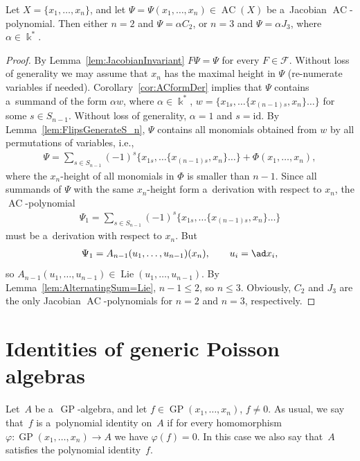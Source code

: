 \begin{theorem}
Let $X=\{x_1,\dots, x_n\}$, and let $\Psi =\Psi(x_1,\dots, x_n)\in \operatorname{AC}(X)$ be a~Jacobian $\operatorname{AC}$-polynomial.
Then either $n=2$ and $\Psi = \alpha C_2$, or $n=3$ and $\Psi = \alpha J_3$, where $\alpha \in \Bbbk^*$.
\end{theorem}

\begin{proof}
By Lemma~\ref{lem:JacobianInvariant} $F\Psi = \Psi$ for every $F\in \mathcal F$.
Without loss of generality we may assume that $x_n$ has the maximal height in $\Psi $ (re-numerate variables if needed).
Corollary~\ref{cor:ACformDer} implies that $\Psi $ contains a~summand of the form $\alpha w$, where $\alpha\in\Bbbk^*$,
$w = \{x_{1s}, \dots \{x_{(n-1)s}, x_n\}\dots \}$ for some $s\in S_{n-1}$.
Without loss of generality, $\alpha =1$ and $s=\mathrm{id}$.
By Lemma~\ref{lem:FlipsGenerateS_n}, $\Psi $ contains all monomials obtained from $w $ by all permutations of variables,
i.e.,
\begin{gather*}
\Psi = \sum\limits_{s\in S_{n-1}}(-1)^s \{x_{1s}, \dots \{x_{(n-1)s}, x_n\}\dots \} + \Phi(x_1,\dots, x_n),
\end{gather*}
where the $x_n$-height of all monomials in $\Phi $ is smaller than $n-1$.
Since all summands of $\Psi $ with the same $x_n$-height form a~derivation with respect to $x_n$, the $\operatorname{AC}$-polynomial
\begin{gather*}
\Psi_1 = \sum\limits_{s\in S_{n-1}}(-1)^s \{x_{1s}, \dots \{x_{(n-1)s}, x_n\}\dots \}
\end{gather*}
must be a~derivation with respect to $x_n$.
But
\begin{gather*}
\Psi_1 = A_{n-1}(u_1,\dots, u_{n-1})(x_n),
\qquad
u_i=\ad x_i,
\end{gather*}
so $A_{n-1}(u_1,\dots, u_{n-1})\in \operatorname{Lie}(u_1,\dots, u_{n-1})$.
By Lemma~\ref{lem:AlternatingSum=Lie}, $n-1\le 2$, so $n\le 3$.
Obviously, $C_2$ and $J_3$ are the only Jacobian $\operatorname{AC}$-polynomials for $n=2$ and $n=3$, respectively.
\end{proof}


\section{Identities of generic Poisson algebras}

Let~$A$ be a~$\operatorname{GP}$-algebra, and let $f\in \operatorname{GP}(x_1,\dots, x_n)$, $f\ne 0$.
As usual, we say that~$f$ is a~polynomial identity on~$A$ if for every homomorphism $\varphi: \operatorname{GP}(x_1,\dots, x_n) \to A$
we have \mbox{$\varphi(f)=0$}.
In this case we also say that~$A$ satisf\/ies the polynomial identity~$f$.

